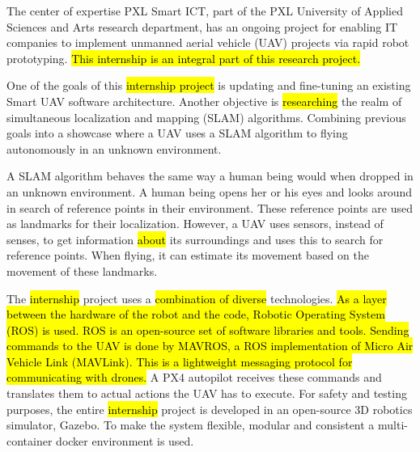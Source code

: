 The center of expertise PXL Smart ICT, part of the PXL University of Applied Sciences and Arts research department, has an ongoing project for enabling IT companies to implement unmanned aerial vehicle (UAV) projects via rapid robot prototyping. \hl{This internship is an integral part of this research project.}

One of the goals of this \hl{internship project} is updating and fine-tuning an existing Smart UAV software architecture. Another objective is \hl{researching} the realm of simultaneous localization and mapping (SLAM) algorithms. Combining previous goals into a showcase where a UAV uses a SLAM algorithm to flying autonomously in an unknown environment.

A SLAM algorithm behaves the same way a human being would when dropped in an unknown environment. A human being opens her or his eyes and looks around in search of reference points in their environment. These reference points are used as landmarks for their localization. However, a UAV uses sensors, instead of senses, to get information \hl{about} its surroundings and uses this to search for reference points. When flying, it can estimate its movement based on the movement of these landmarks.

The \hl{internship} project uses a \hl{combination of diverse} technologies. \hl{As a layer between the hardware of the robot and the code, Robotic Operating System (ROS) is used. ROS is an open-source set of software libraries and tools. Sending commands to the UAV is done by MAVROS, a ROS implementation of Micro Air Vehicle Link (MAVLink). This is a lightweight messaging protocol for communicating with drones.} A PX4 autopilot receives these commands and translates them to actual actions the UAV has to execute. For safety and testing purposes, the entire \hl{internship} project is developed in an open-source 3D robotics simulator, Gazebo. To make the system flexible, modular and consistent a multi-container docker environment is used.

